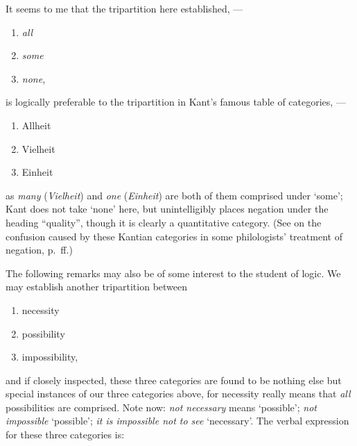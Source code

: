 \label{08-better-tripartition}It seems to me that the tripartition here established, ---


\begin{enumerate}[label=\Alph*., noitemsep]
\item \textit{all}
\item \textit{some}
\item \textit{none},
\end{enumerate}

\noindent is logically preferable to the tripartition in Kant's famous table of categories, ---

\begin{enumerate}[label=\Alph*., noitemsep]
\item Allheit
\item Vielheit
\item Einheit
\end{enumerate}

\noindent as \textit{many} (\textit{Vielheit}) and \textit{one} (\textit{Einheit}) are both of them comprised under `some'; Kant does not take `none' here, but unintelligibly places negation under the heading ``quality'', though it is clearly a quantitative category. (See on the confusion caused by these Kantian categories in some philologists' treatment of negation, p.~\pageref{sec:kant}ff.)

\bigskip{}
The following remarks may also be of some interest to the student of logic. We may establish another tripartition between

\begin{enumerate}[label=\Alph*., noitemsep]
\item necessity
\item possibility
\item impossibility,
\end{enumerate}

\noindent and if closely inspected, these three categories are found to be nothing else but special instances of our three categories above, for necessity really means that \emph{all} possibilities are comprised. Note now: %
\textit{not necessary} means `possible'; \textit{not impossible} `possible'; \textit{it is impossible not to see} `necessary'. The verbal expression for these three categories is: 

